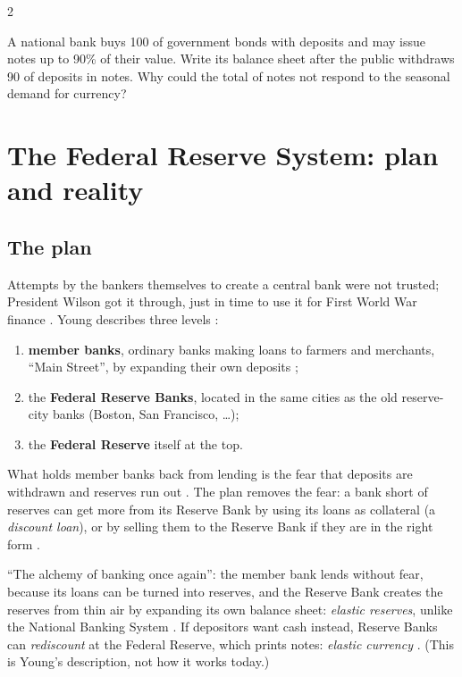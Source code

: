 \begin{paracol}{2}
\begin{exercise}
A national bank buys 100 of government bonds with deposits and may issue notes up to 90\% of their value. Write its balance sheet after the
public withdraws 90 of deposits in notes. Why could the total of notes not respond to the seasonal demand for currency?
\end{exercise}

\section{The Federal Reserve System: plan and reality}\label{sec:st-fed}

\subsection{The plan}
Attempts by the bankers themselves to create a central bank were not trusted; President Wilson got it through, just in time to use it
for First World War finance . Young describes three levels :
\begin{enumerate}
  \item \textbf{member banks}, ordinary banks making loans to farmers and merchants, ``Main Street'', by expanding their own deposits
        ;
  \item the \textbf{Federal Reserve Banks}, located in the same cities as the old reserve-city banks (Boston, San Francisco, \dots);
  \item the \textbf{Federal Reserve} itself at the top.
\end{enumerate}
What holds member banks back from lending is the fear that deposits are withdrawn and reserves run out . The plan removes
the fear: a bank short of reserves can get more from its Reserve Bank by using its loans as collateral (a \emph{discount loan}), or by
selling them to the Reserve Bank if they are in the right form .

\begin{taccts}
\quad
{}
\end{taccts}
``The alchemy of banking once again'': the member bank lends without fear, because its loans can be turned into reserves, and the Reserve
Bank creates the reserves from thin air by expanding its own balance sheet: \emph{elastic reserves}, unlike the National Banking System
. If depositors want cash instead, Reserve Banks can \emph{rediscount} at the Federal Reserve, which prints
notes: \emph{elastic currency} . (This is Young's description, not how it works today.)


\end{paracol}
